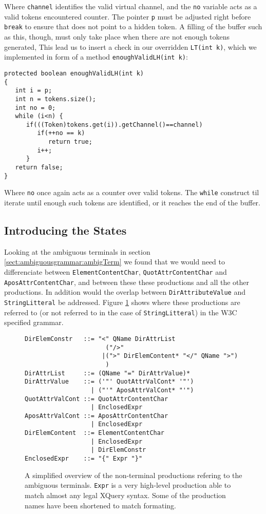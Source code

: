 Where \verb!channel! identifies the valid virtual channel, and the \verb!no! variable acts as a valid tokens encountered counter. The pointer \verb!p! must be adjusted right before \verb!break! to ensure that does not point to a hidden token. A filling of the buffer such as this, though, must only take place when there are not enough tokens generated, This lead us to insert a check in our overridden \verb!LT(int k)!, which we implemented in form of a method \verb!enoughValidLH(int k)!:
\begin{Verbatim}
protected boolean enoughValidLH(int k)
{
   int i = p;
   int n = tokens.size();
   int no = 0;
   while (i<n) {
      if(((Token)tokens.get(i)).getChannel()==channel)
         if(++no == k)
            return true;
         i++;
      }
   return false;
}
\end{Verbatim}
Where \verb!no! once again acts as a counter over valid tokens. The \verb!while! construct til iterate until enough such tokens are identified, or it reaches the end of the buffer.

\subsection{Introducing the States}
\label{sect:rewriteGrammar:introduceStates}
Looking at the ambiguous terminals in section \ref{sect:ambiguousgrammar:ambigTerm} we found that we would need to differenciate between \verb!ElementContentChar!, \verb!QuotAttrContentChar! and \verb!AposAttrContentChar!, and between these these productions and all the other productions. In addition would the overlap between \verb!DirAttributeValue! and \verb!StringLitteral! be addressed. Figure \ref{fig:ambigTerminalRef} shows where these productions are referred to (or not referred to in the case of \verb!StringLitteral!) in the W3C specified grammar. 
\begin{figure}[h!]
\begin{Verbatim}
DirElemConstr   ::= "<" QName DirAttrList 
                      ("/>" 
                     |(">" DirElemContent* "</" QName ">")
                      )
DirAttrList     ::= (QName "=" DirAttrValue)*
DirAttrValue    ::= ('"' QuotAttrValCont* '"')
                  | ("'" AposAttrValCont* "'")
QuotAttrValCont ::= QuotAttrContentChar
                  | EnclosedExpr
AposAttrValCont ::= AposAttrContentChar
                  | EnclosedExpr
DirElemContent  ::= ElementContentChar
                  | EnclosedExpr
                  | DirElemConstr
EnclosedExpr    ::= "{" Expr "}"
\end{Verbatim}
\caption[Grammar reffering to amiguous terminals.]{A simplified overview of the non-terminal productions refering to the ambiguous terminals. \texttt{Expr} is a very high-level production able to match almost any legal XQuery syntax. Some of the production names have been shortened to match formating.}
\label{fig:ambigTerminalRef}
\end{figure}

